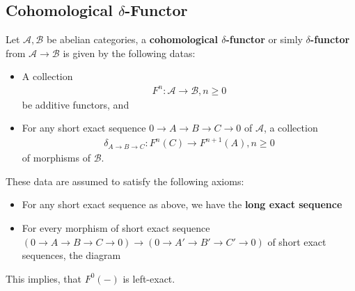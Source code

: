 \documentclass[Total.tex]{subfiles}
\begin{document}
				\subsection{Cohomological $\delta$-Functor}
					\begin{Def}
						Let $\mathcal{A},\mathcal{B}$ be abelian categories, a \textbf{cohomological $\delta$-functor} or simly \textbf{$\delta$-functor} from $\mathcal{A}\rightarrow \mathcal{B}$ is given by the following datas:
						\begin{itemize}
							\item A collection 
							\begin{gather*}
								F^n:\mathcal{A}\rightarrow \mathcal{B},n\geq 0
							\end{gather*}
							be additive functors, and
							\item For any short exact sequence $0\rightarrow A\rightarrow B\rightarrow C\rightarrow 0$ of $\mathcal{A}$, a collection 
							\begin{gather*}
								\delta_{A\rightarrow B\rightarrow C}:F^n(C)\rightarrow F^{n+1}(A),n\geq 0
							\end{gather*}
							of morphisms of $\mathcal{B}$.
						\end{itemize}
						These data are assumed to satisfy the following axioms:
						\begin{itemize}
							\item For any short exact sequence as above, we have the \textbf{long exact sequence}
							\begin{center}
							\end{center}
							\item For every morphism of short exact sequence $(0\rightarrow A\rightarrow B\rightarrow C\rightarrow 0)\rightarrow (0\rightarrow A'\rightarrow B'\rightarrow C'\rightarrow 0)$ of short exact sequences, the diagram
							\begin{center}
							\end{center}
						\end{itemize}
						This implies, that $F^0(-)$ is left-exact.
					\end{Def}
\end{document}
